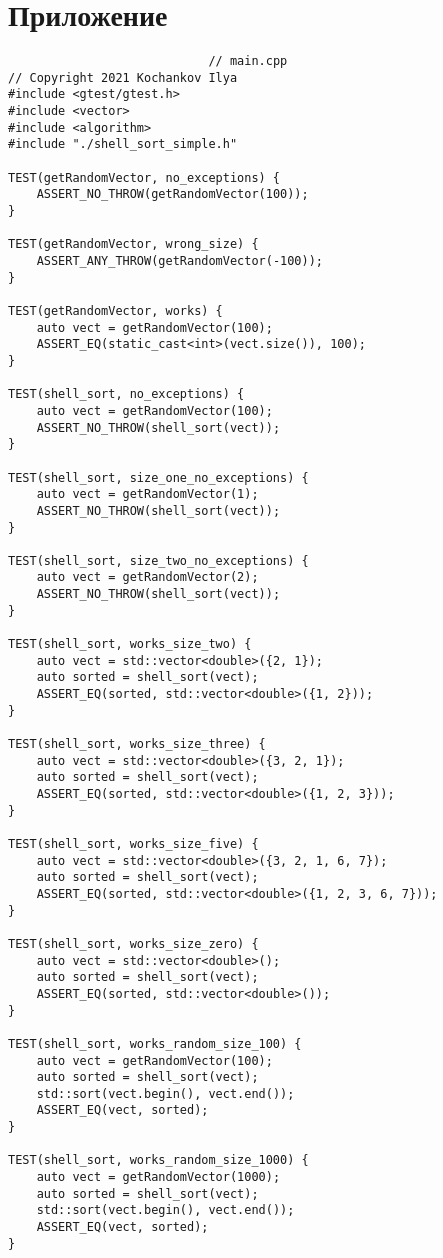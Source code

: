 \documentclass{report}
\begin{document}
\section*{Приложение}
\begin{lstlisting}
							// main.cpp
// Copyright 2021 Kochankov Ilya
#include <gtest/gtest.h>
#include <vector>
#include <algorithm>
#include "./shell_sort_simple.h"

TEST(getRandomVector, no_exceptions) {
    ASSERT_NO_THROW(getRandomVector(100));
}

TEST(getRandomVector, wrong_size) {
    ASSERT_ANY_THROW(getRandomVector(-100));
}

TEST(getRandomVector, works) {
    auto vect = getRandomVector(100);
    ASSERT_EQ(static_cast<int>(vect.size()), 100);
}

TEST(shell_sort, no_exceptions) {
    auto vect = getRandomVector(100);
    ASSERT_NO_THROW(shell_sort(vect));
}

TEST(shell_sort, size_one_no_exceptions) {
    auto vect = getRandomVector(1);
    ASSERT_NO_THROW(shell_sort(vect));
}

TEST(shell_sort, size_two_no_exceptions) {
    auto vect = getRandomVector(2);
    ASSERT_NO_THROW(shell_sort(vect));
}

TEST(shell_sort, works_size_two) {
    auto vect = std::vector<double>({2, 1});
    auto sorted = shell_sort(vect);
    ASSERT_EQ(sorted, std::vector<double>({1, 2}));
}

TEST(shell_sort, works_size_three) {
    auto vect = std::vector<double>({3, 2, 1});
    auto sorted = shell_sort(vect);
    ASSERT_EQ(sorted, std::vector<double>({1, 2, 3}));
}

TEST(shell_sort, works_size_five) {
    auto vect = std::vector<double>({3, 2, 1, 6, 7});
    auto sorted = shell_sort(vect);
    ASSERT_EQ(sorted, std::vector<double>({1, 2, 3, 6, 7}));
}

TEST(shell_sort, works_size_zero) {
    auto vect = std::vector<double>();
    auto sorted = shell_sort(vect);
    ASSERT_EQ(sorted, std::vector<double>());
}

TEST(shell_sort, works_random_size_100) {
    auto vect = getRandomVector(100);
    auto sorted = shell_sort(vect);
    std::sort(vect.begin(), vect.end());
    ASSERT_EQ(vect, sorted);
}

TEST(shell_sort, works_random_size_1000) {
    auto vect = getRandomVector(1000);
    auto sorted = shell_sort(vect);
    std::sort(vect.begin(), vect.end());
    ASSERT_EQ(vect, sorted);
}


\end{lstlisting}
\end{document}
